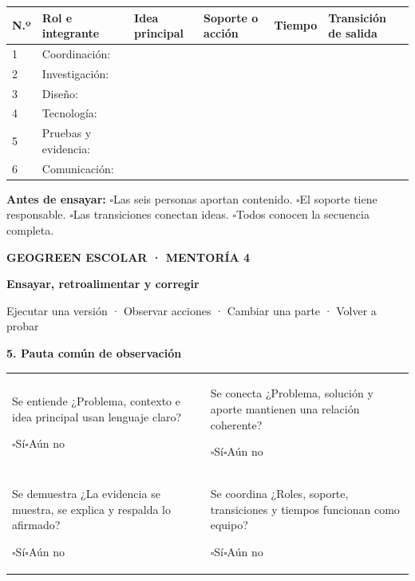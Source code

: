 \documentclass[10pt,a4paper]{article}
\newcommand{\checkline}[1]{$\square$\hspace{1.5mm}#1}
\newcommand{\pagehead}[2]{%
  {\small\bfseries\textcolor{AIEPRed}{GEOGREEN ESCOLAR · MENTORÍA 4}}\par
  \vspace{2mm}
  {\LARGE\bfseries\color{AIEPNavy}#1\par}
  {\normalsize\color{AIEPMuted}#2\par}
  \vspace{4mm}
}
\begin{document}
\scriptsize
\begin{tabularx}{\textwidth}{|C{8mm}|p{25mm}|p{36mm}|p{30mm}|p{17mm}|Y|}
\hline
\textbf{N.º} & \textbf{Rol e integrante} & \textbf{Idea principal} & \textbf{Soporte o acción} & \textbf{Tiempo} & \textbf{Transición de salida} \\
\hline
\rule{0pt}{18mm}1 & Coordinación: & & & & \\
\hline
\rule{0pt}{18mm}2 & Investigación: & & & & \\
\hline
\rule{0pt}{18mm}3 & Diseño: & & & & \\
\hline
\rule{0pt}{18mm}4 & Tecnología: & & & & \\
\hline
\rule{0pt}{18mm}5 & Pruebas y evidencia: & & & & \\
\hline
\rule{0pt}{18mm}6 & Comunicación: & & & & \\
\hline
\end{tabularx}
\normalsize

\begin{tcolorbox}[colback=AIEPBlueSoft,colframe=AIEPLine,boxrule=0.5pt,arc=1mm,left=3mm,right=3mm,top=2mm,bottom=2mm]
\textbf{Antes de ensayar:} \checkline{Las seis personas aportan contenido.}\quad
\checkline{El soporte tiene responsable.}\quad
\checkline{Las transiciones conectan ideas.}\quad
\checkline{Todos conocen la secuencia completa.}
\end{tcolorbox}

\newpage
\pagehead{Ensayar, retroalimentar y corregir}{Ejecutar una versión · Observar acciones · Cambiar una parte · Volver a probar}

{\large\bfseries\color{AIEPNavy}5. Pauta común de observación}\par
\begin{tabularx}{\textwidth}{@{}Y@{\hspace{3mm}}Y@{}}
\begin{fieldbox}[height=31mm]{Se entiende}
¿Problema, contexto e idea principal usan lenguaje claro?\par
\checkline{Sí}\quad\checkline{Aún no}
\end{fieldbox}
&
\begin{fieldbox}[height=31mm]{Se conecta}
¿Problema, solución y aporte mantienen una relación coherente?\par
\checkline{Sí}\quad\checkline{Aún no}
\end{fieldbox}
\\
\begin{fieldbox}[height=31mm]{Se demuestra}
¿La evidencia se muestra, se explica y respalda lo afirmado?\par
\checkline{Sí}\quad\checkline{Aún no}
\end{fieldbox}
&
\begin{fieldbox}[height=31mm]{Se coordina}
¿Roles, soporte, transiciones y tiempos funcionan como equipo?\par
\checkline{Sí}\quad\checkline{Aún no}
\end{fieldbox}
\end{tabularx}
\end{document}
